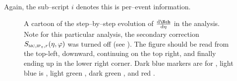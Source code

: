 Again, the sub--script $i$ denotes this is per--event information. 

\begin{figure}[]
  \centering
  \caption{A cartoon of the step--by--step evolution of $\dndeta$ in
    the analysis.  Note for this particular analysis, the secondary
    correction $\SecMap{}$ was turned off (see
    ). The figure should be read from the
    top-left, downward, continuing on the top right, and finally
    ending up in the lower right corner. Dark blue markers are for
    , light blue is , light green , dark green
    , and red .}
  \label{fig:steps}
\end{figure} 


